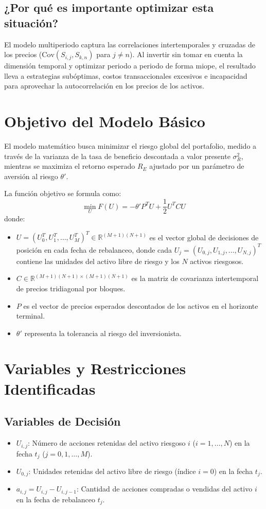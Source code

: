 \documentclass[11pt,a4paper]{article}
\begin{document}
\subsection{¿Por qué es importante optimizar esta situación?}
El modelo multiperiodo captura las correlaciones intertemporales y cruzadas de los precios ($\mathrm{Cov}(S_{i,j}, S_{k,n})$ para $j \neq n$). Al invertir sin tomar en cuenta la dimensión temporal y optimizar periodo a periodo de forma miope, el resultado lleva a estrategias subóptimas, costos transaccionales excesivos e incapacidad para aprovechar la autocorrelación en los precios de los activos.

\section{Objetivo del Modelo Básico}
El modelo matemático busca minimizar el riesgo global del portafolio, medido a través de la varianza de la tasa de beneficio descontada a valor presente $\sigma_R^2$, mientras se maximiza el retorno esperado $R_E$ ajustado por un parámetro de aversión al riesgo $\theta'$.

La función objetivo se formula como:
\begin{equation}
    \min_U F(U) = -\theta' P^T U + \frac{1}{2} U^T C U
\end{equation}
donde:
\begin{itemize}
    \item $U = (U_0^T, U_1^T, \dots, U_M^T)^T \in \mathbb{R}^{(M+1)(N+1)}$ es el vector global de decisiones de posición en cada fecha de rebalanceo, donde cada $U_j = (U_{0,j}, U_{1,j}, \dots, U_{N,j})^T$ contiene las unidades del activo libre de riesgo y los $N$ activos riesgosos.
    \item $C \in \mathbb{R}^{(M+1)(N+1)\times (M+1)(N+1)}$ es la matriz de covarianza intertemporal de precios tridiagonal por bloques.
    \item $P$ es el vector de precios esperados descontados de los activos en el horizonte terminal.
    \item $\theta'$ representa la tolerancia al riesgo del inversionista.
\end{itemize}

\section{Variables y Restricciones Identificadas}

\subsection{Variables de Decisión}
\begin{itemize}
    \item $U_{i,j}$: Número de acciones retenidas del activo riesgoso $i$ ($i = 1, \dots, N$) en la fecha $t_j$ ($j = 0, 1, \dots, M$).
    \item $U_{0,j}$: Unidades retenidas del activo libre de riesgo (índice $i = 0$) en la fecha $t_j$.
    \item $a_{i,j} = U_{i,j} - U_{i,j-1}$: Cantidad de acciones compradas o vendidas del activo $i$ en la fecha de rebalanceo $t_j$.
\end{itemize}
\end{document}
